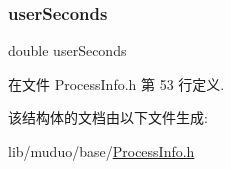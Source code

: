 \subsubsection{\texorpdfstring{user\+Seconds}{userSeconds}}
{\footnotesize\ttfamily double user\+Seconds}



在文件 Process\+Info.\+h 第 53 行定义.



该结构体的文档由以下文件生成\+:\begin{DoxyCompactItemize}
\item 
lib/muduo/base/\hyperlink{ProcessInfo_8h}{Process\+Info.\+h}\end{DoxyCompactItemize}
